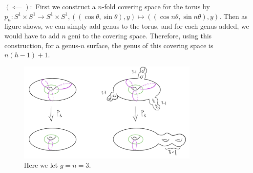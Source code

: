\documentclass[12pt]{article}
\begin{document}
$ (\impliedby):$
First we construct a $ n$-fold covering space for the torus by $ p_n: S^{1} \times S^{1} \to S^{1} \times S^{1},((\cos \theta, \sin \theta),y) \mapsto ((\cos n \theta, \sin n \theta), y)$. Then as figure shows, we can simply add genus to the torus, and for each genus added, we would have to add $ n$ geni to the covering space. Therefore, using this construction, for a genus-$ n$ surface, the genus of this covering space is  $ n(h-1) + 1$.
 ~\begin{figure}[H]
	\centering
	\includegraphics[width=0.8\textwidth]{./figures/covering_surf.png}
	\caption{Here we let $ g=n=3$.}
\end{figure}
\end{document}
